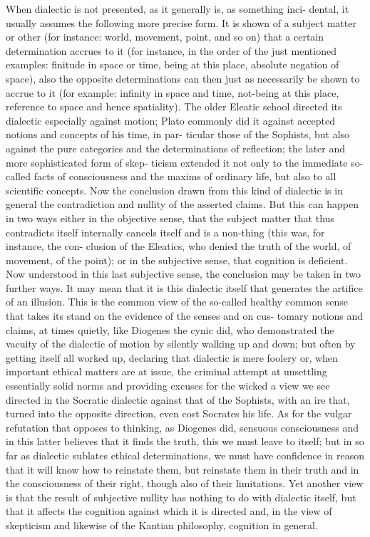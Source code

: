 When dialectic is not presented, as it generally is, as something inci-
dental, it usually assumes the following more precise form. It is shown of
a subject matter or other (for instance: world, movement, point, and so
on) that a certain determination accrues to it (for instance, in the order of
the just mentioned examples: finitude in space or time, being at this place,
absolute negation of space), also the opposite determinations can then just
as necessarily be shown to accrue to it (for example: infinity in space and
time, not-being at this place, reference to space and hence spatiality). The
older Eleatic school directed its dialectic especially against motion; Plato
commonly did it against accepted notions and concepts of his time, in par-
ticular those of the Sophists, but also against the pure categories and the
determinations of reflection; the later and more sophisticated form of skep-
ticism extended it not only to the immediate so-called facts of consciousness
and the maxims of ordinary life, but also to all scientific concepts. Now the
conclusion drawn from this kind of dialectic is in general the contradiction
and nullity of the asserted claims. But this can happen in two ways
 either
in the objective sense, that the subject matter that thus contradicts itself
internally cancels itself and is a non-thing (this was, for instance, the con-
clusion of the Eleatics, who denied the truth of the world, of movement,
of the point); or in the subjective sense, that cognition is deficient. Now
understood in this last subjective sense, the conclusion may be taken in
two further ways. It may mean that it is this dialectic itself that generates
the artifice of an illusion. This is the common view of the so-called healthy
common sense that takes its stand on the evidence of the senses and on cus-
tomary notions and claims, at times quietly, like Diogenes the cynic did, who
demonstrated the vacuity of the dialectic of motion by silently walking up
and down; but often by getting itself all worked up, declaring that dialectic
is mere foolery or, when important ethical matters are at issue, the criminal
attempt at unsettling essentially solid norms and providing excuses for the
wicked
 a view we see directed in the Socratic dialectic against that of
the Sophists, with an ire that, turned into the opposite direction, even cost
Socrates his life. As for the vulgar refutation that opposes to thinking, as
Diogenes did, sensuous consciousness and in this latter believes that it finds
the truth, this we must leave to itself; but in so far as dialectic sublates
ethical determinations, we must have confidence in reason that it will
know how to reinstate them, but reinstate them in their truth and in the
consciousness of their right, though also of their limitations.
 Yet another
view is that the result of subjective nullity has nothing to do with dialectic
itself, but that it affects the cognition against which it is directed and, in
the view of skepticism and likewise of the Kantian philosophy, cognition in
general.

